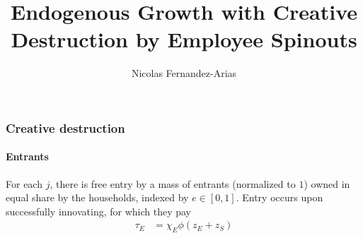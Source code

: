 \documentclass[11pt,english]{article}
\theoremstyle{remark}
\begin{document}
	
	\title{Endogenous Growth with Creative Destruction by Employee Spinouts}
	\author{Nicolas Fernandez-Arias}
	\maketitle



\subsubsection{Creative destruction}

\paragraph{Entrants} For each $j$, there is free entry by a mass of entrants (normalized to $1$) owned in equal share by the households, indexed by $e \in [0,1]$. Entry occurs upon successfully innovating, for which they pay 
\begin{align}
	\tau_E &= \chi_E \phi(z_E + z_S) \label{simplified_entrant_innovation_rate}
\end{align}
\end{document}
